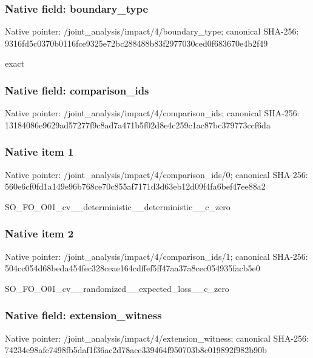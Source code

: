 \documentclass[10pt,a4paper]{article}
\begin{document}
\subsubsection{Native field: boundary\_\allowbreak{}type}
Native pointer: /joint\_\allowbreak{}analysis/impact/4/boundary\_\allowbreak{}type; canonical SHA-256: 9316fd5c0370b0116fce9325e72bc288488b83f2977030ced0f683670e4b2f49

\begingroup\raggedright\sloppy exact\par\endgroup

\subsubsection{Native field: comparison\_\allowbreak{}ids}
Native pointer: /joint\_\allowbreak{}analysis/impact/4/comparison\_\allowbreak{}ids; canonical SHA-256: 13184086e9629ad57277f9c8ad7a471b5f02d8e4c259c1ac87bc379773ccf6da

\subsubsection{Native item 1}
Native pointer: /joint\_\allowbreak{}analysis/impact/4/comparison\_\allowbreak{}ids/0; canonical SHA-256: 560e6cf0fd1a149e96b768ce70c855af7171d3d63eb12d09f4fa6bef47ee88a2

\begingroup\raggedright\sloppy SO\_\allowbreak{}FO\_\allowbreak{}O01\_\allowbreak{}cv\_\allowbreak{}\_\allowbreak{}deterministic\_\allowbreak{}\_\allowbreak{}deterministic\_\allowbreak{}\_\allowbreak{}c\_\allowbreak{}zero\par\endgroup

\subsubsection{Native item 2}
Native pointer: /joint\_\allowbreak{}analysis/impact/4/comparison\_\allowbreak{}ids/1; canonical SHA-256: 504cc054d68beda454fec328ceae164cdffef5ff47aa37a8cec054935facb5e0

\begingroup\raggedright\sloppy SO\_\allowbreak{}FO\_\allowbreak{}O01\_\allowbreak{}cv\_\allowbreak{}\_\allowbreak{}randomized\_\allowbreak{}\_\allowbreak{}expected\_\allowbreak{}loss\_\allowbreak{}\_\allowbreak{}c\_\allowbreak{}zero\par\endgroup

\subsubsection{Native field: extension\_\allowbreak{}witness}
Native pointer: /joint\_\allowbreak{}analysis/impact/4/extension\_\allowbreak{}witness; canonical SHA-256: 74234e98afe7498fb5daf1f36ac2d78acc339464f950703b8c019892f982b90b
\end{document}
